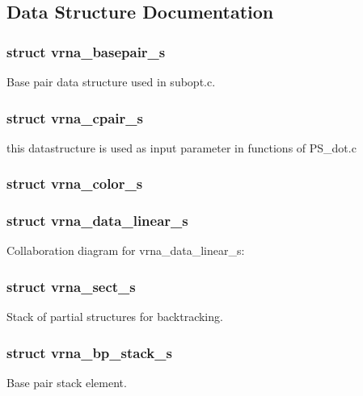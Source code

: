 \subsection{Data Structure Documentation}
\label{structvrna__basepair__s}
\subsubsection{struct vrna\+\_\+basepair\+\_\+s}
Base pair data structure used in subopt.\+c. \label{structvrna__cpair__s}
\subsubsection{struct vrna\+\_\+cpair\+\_\+s}
this datastructure is used as input parameter in functions of P\+S\+\_\+dot.\+c \label{structvrna__color__s}
\subsubsection{struct vrna\+\_\+color\+\_\+s}
\label{structvrna__data__linear__s}
\subsubsection{struct vrna\+\_\+data\+\_\+linear\+\_\+s}


Collaboration diagram for vrna\+\_\+data\+\_\+linear\+\_\+s\+:
\label{structvrna__sect__s}
\subsubsection{struct vrna\+\_\+sect\+\_\+s}
Stack of partial structures for backtracking. \label{structvrna__bp__stack__s}
\subsubsection{struct vrna\+\_\+bp\+\_\+stack\+\_\+s}
Base pair stack element. \label{structpu__contrib}
